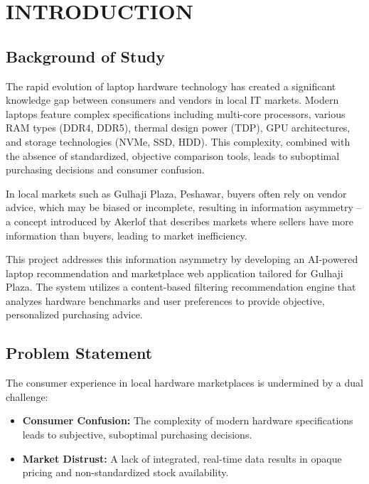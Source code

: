 \chapter{INTRODUCTION}

\section{Background of Study}
The rapid evolution of laptop hardware technology has created a significant
knowledge gap between consumers and vendors in local IT markets. Modern laptops
feature complex specifications including multi-core processors, various RAM types
(DDR4, DDR5), thermal design power (TDP), GPU architectures, and storage
technologies (NVMe, SSD, HDD). This complexity, combined with the absence of
standardized, objective comparison tools, leads to suboptimal purchasing decisions
and consumer confusion.

In local markets such as Gulhaji Plaza, Peshawar, buyers often rely on vendor
advice, which may be biased or incomplete, resulting in information asymmetry
-- a concept introduced by Akerlof \cite{akerlof1970} that describes markets
where sellers have more information than buyers, leading to market inefficiency.

This project addresses this information asymmetry by developing an AI-powered
laptop recommendation and marketplace web application tailored for Gulhaji
Plaza. The system utilizes a content-based filtering recommendation engine that
analyzes hardware benchmarks and user preferences to provide objective,
personalized purchasing advice.

\section{Problem Statement}
The consumer experience in local hardware marketplaces is undermined by a dual
challenge:
\begin{itemize}
  \item \textbf{Consumer Confusion:} The complexity of modern hardware
    specifications leads to subjective, suboptimal purchasing decisions.
  \item \textbf{Market Distrust:} A lack of integrated, real-time data results
    in opaque pricing and non-standardized stock availability.
\end{itemize}

